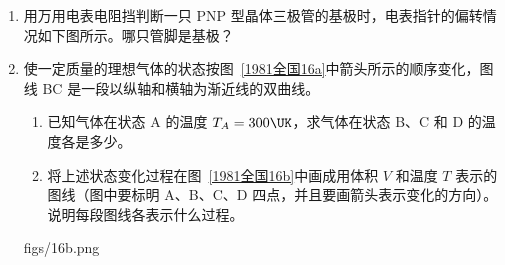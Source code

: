 \documentclass[\gkver]{gaokaozhenti}
\begin{document}
\begin{enumerate}
{评分说明：共 4 分。第一步调节，占 2 分；只答出要调节底板水平的，给 1 分；既答对调节 S 又答出调节好了的标志的，再给 1 分，二者缺一的，不再给分。第二步调节，也占 2 分；只答出要调节天平平衡的，给 1 分；既答对调节 $S'$ 又答出调节好了的标志的，再给 1 分，二者缺一的，不再给分。
}

\item
用万用电表电阻挡判断一只 PNP 型晶体三极管的基极时，电表指针的偏转情况如下图所示。哪只管脚是基极？

\item
使一定质量的理想气体的状态按图~\ref{1981全国16a}中箭头所示的顺序变化，图线 BC 是一段以纵轴和横轴为渐近线的双曲线。
\begin{enumerate}
	\item
	已知气体在状态 A 的温度 $T_{A}=300\UK$，求气体在状态 B、C 和 D 的温度各是多少。
	\item
	将上述状态变化过程在图~\ref{1981全国16b}中画成用体积 $V$ 和温度 $T$ 表示的图线（图中要标明 A、B、C、D 四点，并且要画箭头表示变化的方向）。说明每段图线各表示什么过程。
\end{enumerate}
{figs/16b.png}
\end{enumerate}
\end{document}
